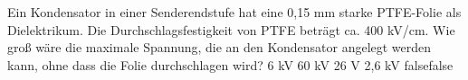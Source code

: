     {Ein Kondensator in einer Senderendstufe hat eine 0,15 mm starke PTFE-Folie als Dielektrikum. Die Durchschlagsfestigkeit von PTFE beträgt ca. 400 kV/cm. Wie groß wäre die maximale Spannung, die an den Kondensator angelegt werden kann, ohne dass die Folie durchschlagen wird?}
    {6 kV}
    {60 kV}
    {26 V}
    {2,6 kV}
    {false}{false}